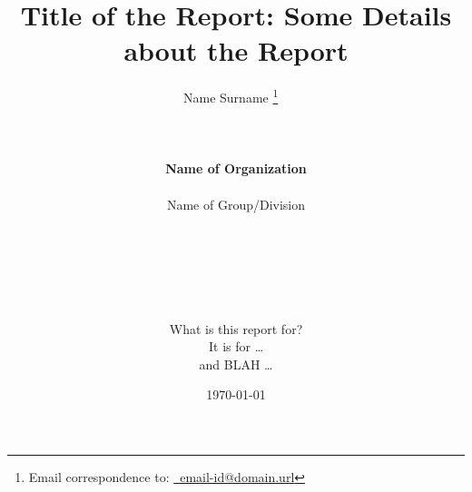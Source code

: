 \documentclass[letterpaper,12pt]{report}
\begin{document}










%
%
\title{\Huge \bf Title of the Report: Some Details about the Report}

\date{\today}

\author{{\LARGE Name Surname}
\thanks{Email correspondence to: \href{mailto:email-id@domain.url}{\Email\ email-id@domain.url}}
\ \\
\vspace{-4.0in}
\ \\
\ \\
\ \\
{\bf \LARGE
	Name of Organization
	\vspace{0.1cm}} \\
\hline
\ \\
{\Large \sc Name of Group/Division} \\
\ \\
\ \\
\ \\
\ \\
\ \\
\vspace{2.0in}
\ \\
{\large \sc What is this report for?} \\
{\large It is for \dots} \\
{\large and BLAH \dots}
}

\maketitle


%
\end{document}
